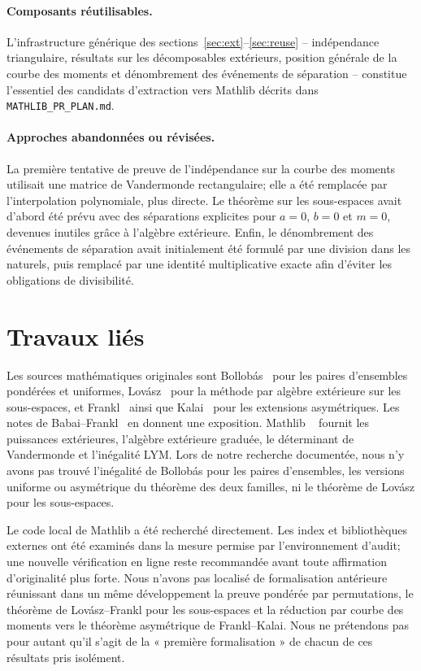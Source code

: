 \documentclass[11pt]{article}
\begin{document}
\paragraph{Composants réutilisables.} L'infrastructure générique des
sections~\ref{sec:ext}--\ref{sec:reuse} -- indépendance triangulaire, résultats sur les
décomposables extérieurs, position générale de la courbe des moments et dénombrement des
événements de séparation -- constitue l'essentiel des candidats d'extraction vers
Mathlib décrits dans \texttt{MATHLIB\_PR\_PLAN.md}.

\paragraph{Approches abandonnées ou révisées.} La première tentative de preuve de
l'indépendance sur la courbe des moments utilisait une matrice de Vandermonde
rectangulaire; elle a été remplacée par l'interpolation polynomiale, plus directe. Le
théorème sur les sous-espaces avait d'abord été prévu avec des séparations explicites
pour $a=0$, $b=0$ et $m=0$, devenues inutiles grâce à l'algèbre extérieure. Enfin, le
dénombrement des événements de séparation avait initialement été formulé par une
division dans les naturels, puis remplacé par une identité multiplicative exacte afin
d'éviter les obligations de divisibilité.

\section{Travaux liés}\label{sec:related}

Les sources mathématiques originales sont Bollobás~\cite{bollobas1965} pour les paires
d'ensembles pondérées et uniformes, Lovász~\cite{lovasz1977} pour la méthode par algèbre
extérieure sur les sous-espaces, et Frankl~\cite{frankl1982} ainsi que
Kalai~\cite{kalai1984} pour les extensions asymétriques. Les notes de
Babai--Frankl~\cite{babaifrankl1992} en donnent une exposition. Mathlib
~\cite{mathlib2020} fournit les puissances extérieures, l'algèbre extérieure graduée, le
déterminant de Vandermonde et l'inégalité LYM. Lors de notre recherche documentée, nous
n'y avons pas trouvé l'inégalité de Bollobás pour les paires d'ensembles, les versions
uniforme ou asymétrique du théorème des deux familles, ni le théorème de Lovász pour les
sous-espaces.

Le code local de Mathlib a été recherché directement. Les index et bibliothèques
externes ont été examinés dans la mesure permise par l'environnement d'audit; une
nouvelle vérification en ligne reste recommandée avant toute affirmation d'originalité
plus forte. Nous n'avons pas localisé de formalisation antérieure réunissant dans un
même développement la preuve pondérée par permutations, le théorème de
Lovász--Frankl pour les sous-espaces et la réduction par courbe des moments vers le
théorème asymétrique de Frankl--Kalai. Nous ne prétendons pas pour autant qu'il s'agit de
la « première formalisation » de chacun de ces résultats pris isolément.
\end{document}
